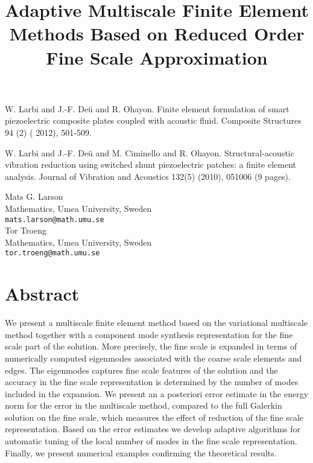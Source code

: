 \documentclass[article,A4,11pt]{llncs}%
\begin{document}

\begin{thebibliography}{10}
{\sc W. Larbi and J.-F. De\"{u} and R. Ohayon}. {Finite element formulation of smart piezoelectric composite plates coupled with acoustic fluid}. Composite Structures 94 (2) ( 2012), 501-509.

{\sc W. Larbi and J.-F. De\"{u} and M. Ciminello and R. Ohayon}. {Structural-acoustic vibration reduction using switched shunt piezoelectric patches: a finite element analysis}. Journal of Vibration and Acoustics 132(5) (2010), 051006 (9 pages).
\end{thebibliography}

\title{Adaptive Multiscale Finite Element Methods Based on Reduced Order Fine Scale Approximation}
 \author{} \institute{}
\maketitle
\begin{center}
{\large Mats G. Larson}\\
Mathematics, Umea University, Sweden\\
{\tt mats.larson@math.umu.se}
\\ \vspace{4mm}
{\large Tor Troeng}\\
Mathematics, Umea University, Sweden\\
{\tt tor.troeng@math.umu.se}
\end{center}

\section*{Abstract}
We present a multiscale finite element method based on the variational multiscale method together with a component mode synthesis representation for the fine scale part of the solution. More precisely, the fine scale is expanded in terms of numerically computed eigenmodes associated with the coarse scale elements and edges. The eigenmodes captures fine scale features of the solution and the accuracy in the fine scale representation is determined by the number of modes included in the expansion. We present an a posteriori error estimate in the energy norm for the error in the multiscale method, compared to the full Galerkin solution on the fine scale, which measures the effect of reduction of the fine scale representation. Based on the error estimates we develop adaptive algorithms for automatic tuning of the local number of modes in the fine scale representation. Finally, we present numerical examples confirming the theoretical results.
\end{document}
